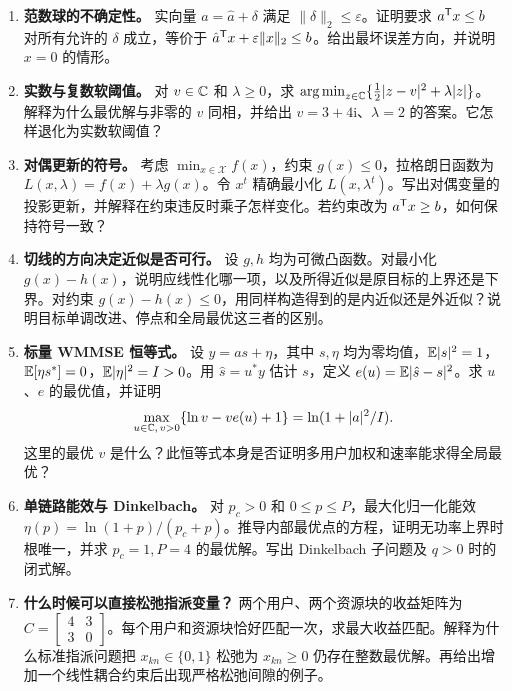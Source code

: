 \begin{enumerate}[label=\textbf{\arabic*.},ref=\arabic*,itemsep=10pt]
\item \label{ex:robust}\textbf{范数球的不确定性。}
实向量 $a=\hat a+\delta$ 满足 $\|\delta\|_2\leq\varepsilon$。证明要求 $a^{\mathsf T}x\leq b$ 对所有允许的 $\delta$ 成立，等价于
$\hat a^{\mathsf T}x+\varepsilon\|x\|_2\leq b$。给出最坏误差方向，并说明 $x=0$ 的情形。

\item \label{ex:prox}\textbf{实数与复数软阈值。}
对 $v\in\mathbb C$ 和 $\lambda\geq0$，求
$\operatorname*{arg\,min}_{z\in\mathbb C}\{\frac12|z-v|^2+\lambda|z|\}$。
解释为什么最优解与非零的 $v$ 同相，并给出 $v=3+4\mathrm i$、$\lambda=2$ 的答案。它怎样退化为实数软阈值？

\item \label{ex:dual}\textbf{对偶更新的符号。}
考虑 $\min_{x\in\mathcal X} f(x)$，约束 $g(x)\leq0$，拉格朗日函数为 $L(x,\lambda)=f(x)+\lambda g(x)$。令 $x^t$ 精确最小化 $L(x,\lambda^t)$。写出对偶变量的投影更新，并解释在约束违反时乘子怎样变化。若约束改为 $a^{\mathsf T}x\geq b$，如何保持符号一致？

\item \label{ex:sca}\textbf{切线的方向决定近似是否可行。}
设 $g,h$ 均为可微凸函数。对最小化 $g(x)-h(x)$，说明应线性化哪一项，以及所得近似是原目标的上界还是下界。对约束 $g(x)-h(x)\leq0$，用同样构造得到的是内近似还是外近似？说明目标单调改进、停点和全局最优这三者的区别。

\item \label{ex:wmmse}\textbf{标量 WMMSE 恒等式。}
设 $y=as+\eta$，其中 $s,\eta$ 均为零均值，$\mathbb E|s|^2=1$，$\mathbb E[\eta s^*]=0$，$\mathbb E|\eta|^2=I>0$。用 $\hat s=u^*y$ 估计 $s$，定义 $e(u)=\mathbb E|\hat s-s|^2$。求 $u$、$e$ 的最优值，并证明
\[
 \max_{u\in\mathbb C,\,v>0}\{\ln v-ve(u)+1\}=\ln(1+|a|^2/I).
\]
这里的最优 $v$ 是什么？此恒等式本身是否证明多用户加权和速率能求得全局最优？

\item \label{ex:ee}\textbf{单链路能效与 Dinkelbach。}
对 $p_c>0$ 和 $0\leq p\leq P$，最大化归一化能效
$\eta(p)=\ln(1+p)/(p_c+p)$。推导内部最优点的方程，证明无功率上界时根唯一，并求 $p_c=1,P=4$ 的最优解。写出 Dinkelbach 子问题及 $q>0$ 时的闭式解。

\item \label{ex:assignment}\textbf{什么时候可以直接松弛指派变量？}
两个用户、两个资源块的收益矩阵为
$C=\left[\begin{smallmatrix}4&3\\3&0\end{smallmatrix}\right]$。每个用户和资源块恰好匹配一次，求最大收益匹配。解释为什么标准指派问题把 $x_{kn}\in\{0,1\}$ 松弛为 $x_{kn}\geq0$ 仍存在整数最优解。再给出增加一个线性耦合约束后出现严格松弛间隙的例子。


\end{enumerate}
